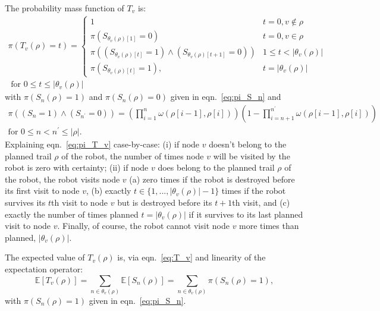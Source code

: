\documentclass[11pt, oneside]{article}
\begin{document}
The probability mass function of $T_v$ is:
\begin{multline}
	\pi(T_v(\rho) = t ) = 
	\begin{cases}
		1 & t = 0, v\notin \rho\\
		 \pi\left(S_{\theta_v(\rho)[1]}=0\right)& t = 0, v \in \rho \\
		\pi\left( (S_{\theta_v(\rho)[t]}=1) \land (S_{\theta_v(\rho)[t+1]}=0)\right)    & 1 \leq t < \lvert \theta_v(\rho ) \rvert \\
		\pi\left( S_{\theta_v(\rho)[t]}=1 \right), & t = \lvert \theta_v(\rho ) \rvert  	
	\end{cases}
	 \\ \text{ for } 0 \leq t \leq \lvert \theta_v(\rho) \rvert 
	 \label{eq:pi_T_v}
\end{multline}
with $\pi(S_n(\rho)=1)$ and $\pi(S_n(\rho)=0)$ given in eqn.~\ref{eq:pi_S_n} and
\begin{multline}
	\pi\left( (S_n=1) \land (S_{n^\prime}=0)\right) =	\left( \prod_{i=1}^n \omega(\rho[i-1], \rho[i]) \right)	\left(1-\prod_{i=n+1}^{n^\prime} \omega(\rho[i-1], \rho[i]) \right) \\
	\text{for } 0 \leq n < n^\prime \leq \lvert \rho\rvert.
\end{multline}
Explaining eqn.~\ref{eq:pi_T_v} case-by-case: 
(i) if node $v$ doesn't belong to the planned trail $\rho$ of the robot, the number of times node $v$ will be visited by the robot is zero with certainty;
(ii) if node $v$ does belong to the planned trail $\rho$ of the robot, the robot visits node $v$
(a) zero times if the robot is destroyed before its first visit to node $v$,
(b) exactly $t \in \{1, ..., \lvert \theta_v(\rho)\rvert-1\}$ times if the robot survives its $t$th visit to node $v$ but is destroyed before its $t+1$th visit, and
(c) exactly the number of times planned $t=\lvert \theta_v(\rho) \rvert$ if it survives to its last planned visit to node $v$.
Finally, of course, the robot cannot visit node $v$ more times than planned, $\lvert \theta_v(\rho) \rvert$.

The expected value of $T_v(\rho)$ is, via eqn.~\ref{eq:T_v} and linearity of the expectation operator:
\begin{equation}
	\mathbb{E}[T_v(\rho)] = \sum_{n \in \theta_v(\rho) } \mathbb{E}[S_n(\rho)] = \sum_{n \in \theta_v(\rho) } \pi(S_n(\rho)=1), %
	\label{eq:E_T_v}
\end{equation}
with $\pi(S_n(\rho)=1)$ given in eqn.~\ref{eq:pi_S_n}.
\end{document}
